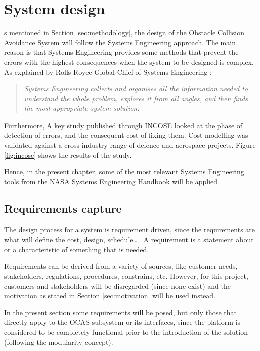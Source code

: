 
\let\textcircled=\pgftextcircled
\chapter{System design}

s mentioned in Section \ref{sec:methodology}, the design of the Obstacle Collision Avoidance System will follow the Systems Engineering approach.
The main reason is that Systems Engineering provides some methods that prevent the errors with the highest consequences when the system to be designed is complex.
As explained by Rolls-Royce Global Chief of Systems Engineering \cite{beasley2015}:
\begin{quote}
	\itshape
	Systems Engineering collects and organises all the information needed to understand the whole problem, explores it from all angles, and then finds the most appropriate system solution.
\end{quote}

Furthermore, A key study published through INCOSE \cite{incoseuk2016} looked at the phase of detection of errors, and the consequent cost of fixing them.
Cost modelling was validated against a cross-industry range of defence and aerospace projects.
Figure \ref{fig:incose} shows the results of the study.



Hence, in the present chapter, some of the most relevant Systems Engineering tools from the NASA Systems Engineering Handbook \cite{nationalaeronauticsandspaceadministration2007} will be applied


\section{Requirements capture} \label{sec:sysReqs}

The design process for a system is requirement driven, since the requirements are what will define the cost, design, schedule\ldots\ %
A requirement is a statement about or a characteristic of something that is needed.

Requirements can be derived from a variety of sources, like customer needs, stakeholders, regulations, procedures, constrains, etc.
However, for this project, customers and stakeholders will be disregarded (since none exist) and the motivation as stated in Section \ref{sec:motivation} will be used instead.

In the present section some requirements will be posed, but only those that directly apply to the OCAS subsystem or its interfaces, since the platform is considered to be completely functional prior to the introduction of the solution (following the modularity concept).

